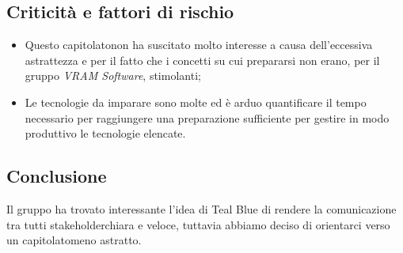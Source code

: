 \subsection{Criticità e fattori di rischio}
\begin{itemize}
	\item Questo capitolato\glosp non ha suscitato molto interesse a causa dell'eccessiva astrattezza e per il fatto che i concetti su cui prepararsi non erano, per il gruppo \textit{VRAM Software}, stimolanti;
	\item Le tecnologie da imparare sono molte ed è arduo quantificare il tempo necessario per raggiungere una preparazione sufficiente per gestire in modo produttivo le tecnologie elencate.
\end{itemize}
\subsection{Conclusione}
Il gruppo ha trovato interessante l'idea di Teal Blue di rendere la comunicazione tra tutti stakeholder\glosp chiara e veloce, tuttavia abbiamo deciso di orientarci verso un capitolato\glosp meno astratto.